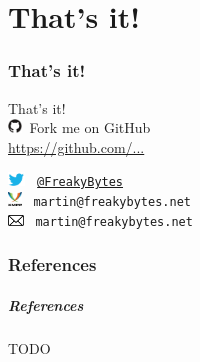 \part{That's it!}
\label{end}

\section*{That's it!}
\begin{frame}[c]
	{\LARGE That's it!}\\
	
	\includegraphics[height=1em]{res/github.pdf}\ 
	Fork me on GitHub\\
	\hspace{5mm} \textcolor{colorscheme}{\url{https://github.com/...}}
	
	\vspace{2em}
	
	\includegraphics[height=1em]{res/twitter.png}
	\hspace{3.5mm} \textcolor{colorscheme}{\tt\  \href{https://twitter.com/FreakyBytes}{@FreakyBytes}}\\
	
	\includegraphics[height=1em]{res/XMPP_logo.pdf}
	\hspace{5mm} \textcolor{colorscheme}{\tt\  martin@freakybytes.net}\\
	
	\includegraphics[height=0.8em]{res/mail.pdf}
	\hspace{4.45mm} \textcolor{colorscheme}{\tt\  martin@freakybytes.net}\\
		
\end{frame}

\section{References}
\begin{frame}[c]
	\frametitle{References}
	
	\alert{TODO}
\end{frame}